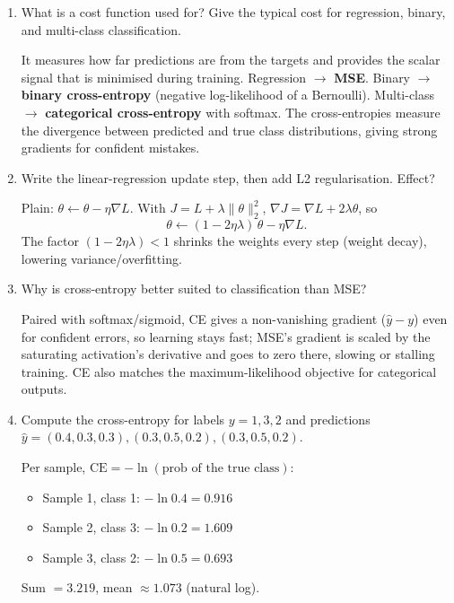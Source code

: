 \documentclass[10pt,a4paper]{article}
\newcommand{\q}[1]{\item #1}
\begin{document}
\begin{enumerate}[leftmargin=*,label=\textbf{Q\arabic*.}]

\q What is a cost function used for? Give the typical cost for regression, binary, and multi-class classification.
\begin{answerbox}
It measures how far predictions are from the targets and provides the scalar signal that is minimised during training. Regression $\to$ \textbf{MSE}. Binary $\to$ \textbf{binary cross-entropy} (negative log-likelihood of a Bernoulli). Multi-class $\to$ \textbf{categorical cross-entropy} with softmax. The cross-entropies measure the divergence between predicted and true class distributions, giving strong gradients for confident mistakes.
\end{answerbox}

\q Write the linear-regression update step, then add L2 regularisation. Effect?
\begin{answerbox}
Plain: $\theta \leftarrow \theta - \eta \nabla L$. With $J = L + \lambda\lVert\theta\rVert_2^2$, $\nabla J = \nabla L + 2\lambda\theta$, so
\[ \theta \leftarrow (1-2\eta\lambda)\,\theta - \eta\nabla L. \]
The factor $(1-2\eta\lambda)<1$ shrinks the weights every step (weight decay), lowering variance/overfitting.
\end{answerbox}

\q Why is cross-entropy better suited to classification than MSE?
\begin{answerbox}
Paired with softmax/sigmoid, CE gives a non-vanishing gradient ($\hat y - y$) even for confident errors, so learning stays fast; MSE's gradient is scaled by the saturating activation's derivative and goes to zero there, slowing or stalling training. CE also matches the maximum-likelihood objective for categorical outputs.
\end{answerbox}

\q Compute the cross-entropy for labels $y=1,3,2$ and predictions $\hat y=(0.4,0.3,0.3),(0.3,0.5,0.2),(0.3,0.5,0.2)$.
\begin{answerbox}
Per sample, $\mathrm{CE}=-\ln(\text{prob of the true class})$:
\begin{itemize}[leftmargin=*,nosep]
\item Sample 1, class 1: $-\ln 0.4 = 0.916$
\item Sample 2, class 3: $-\ln 0.2 = 1.609$
\item Sample 3, class 2: $-\ln 0.5 = 0.693$
\end{itemize}
Sum $= 3.219$, mean $\approx 1.073$ (natural log).
\end{answerbox}

\end{enumerate}
\end{document}

